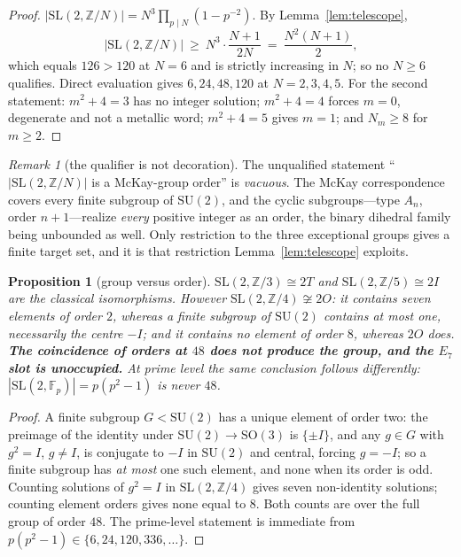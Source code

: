 \documentclass[11pt,reqno]{amsart}
\theoremstyle{plain}
\newtheorem{proposition}[theorem]{Proposition}
\theoremstyle{definition}
\theoremstyle{remark}
\newtheorem{remark}[theorem]{Remark}
\newcommand{\Z}{\mathbb{Z}}
\newcommand{\SL}{\mathrm{SL}}
\newcommand{\SU}{\mathrm{SU}}
\begin{document}
\begin{proof}
$|\SL(2,\Z/N)|=N^{3}\prod_{p\mid N}(1-p^{-2})$. By Lemma~\ref{lem:telescope},
\[
  |\SL(2,\Z/N)|\ \ge\ N^{3}\cdot\frac{N+1}{2N}\ =\ \frac{N^{2}(N+1)}{2},
\]
which equals $126>120$ at $N=6$ and is strictly increasing in $N$; so no $N\ge6$
qualifies. Direct evaluation gives $6,24,48,120$ at $N=2,3,4,5$. For the second
statement: $m^2+4=3$ has no integer solution; $m^2+4=4$ forces $m=0$, degenerate and not
a metallic word; $m^2+4=5$ gives $m=1$; and $N_m\ge8$ for $m\ge2$.
\end{proof}

\begin{remark}[the qualifier is not decoration]\label{rem:vacuous}
The unqualified statement ``$|\SL(2,\Z/N)|$ is a McKay-group order'' is \emph{vacuous}.
The McKay correspondence covers every finite subgroup of $\SU(2)$, and the cyclic
subgroups---type $A_n$, order $n+1$---realize \emph{every} positive integer as an order,
the binary dihedral family being unbounded as well. Only restriction to the three
exceptional groups gives a finite target set, and it is that restriction
Lemma~\ref{lem:telescope} exploits.
\end{remark}

\begin{proposition}[group versus order]\label{prop:group}
$\SL(2,\Z/3)\cong2T$ and $\SL(2,\Z/5)\cong2I$ are the classical isomorphisms. However
$\SL(2,\Z/4)\not\cong2O$: it contains seven elements of order $2$, whereas a finite
subgroup of $\SU(2)$ contains \emph{at most} one, necessarily the centre $-I$; and it contains no
element of order $8$, whereas $2O$ does. \textbf{The coincidence of orders at $48$ does
not produce the group, and the $E_7$ slot is unoccupied.} At prime level the same
conclusion follows differently: $|\SL(2,\mathbb F_p)|=p(p^2-1)$ is never $48$.
\end{proposition}

\begin{proof}
A finite subgroup $G<\SU(2)$ has a unique element of order two: the preimage of the
identity under $\SU(2)\to\mathrm{SO}(3)$ is $\{\pm I\}$, and any $g\in G$ with $g^2=I$,
$g\neq I$, is conjugate to $-I$ in $\SU(2)$ and central, forcing $g=-I$; so a finite
subgroup has \emph{at most} one such element, and none when its order is odd. Counting
solutions of $g^2=I$ in $\SL(2,\Z/4)$ gives seven non-identity solutions; counting
element orders gives none equal to $8$. Both counts are over the full group of order
$48$. The prime-level statement is immediate from $p(p^2-1)\in\{6,24,120,336,\dots\}$.
\end{proof}
\end{document}
